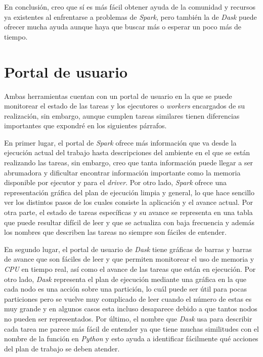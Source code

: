 En conclusión, creo que sí es más fácil obtener ayuda de la comunidad y recursos ya existentes al enfrentarse a problemas de \textit{Spark}, pero también la de \textit{Dask} puede ofrecer mucha ayuda aunque haya que buscar más o esperar un poco más de tiempo.

\section{Portal de usuario}

Ambas herramientas cuentan con un portal de usuario en la que se puede monitorear el estado de las tareas y los ejecutores o \textit{workers} encargados de su realización, sin embargo, aunque cumplen tareas similares tienen diferencias importantes que expondré en los siguientes párrafos.

En primer lugar, el portal de \textit{Spark} ofrece más información que va desde la ejecución actual del trabajo hasta descripciones del ambiente en el que se están realizando las tareas, sin embargo, creo que tanta información puede llegar a ser abrumadora y dificultar encontrar información importante como la memoria disponible por ejecutor y para el \textit{driver}. Por otro lado, \textit{Spark} ofrece una representación gráfica del plan de ejecución limpia y general, lo que hace sencillo ver los distintos pasos de los cuales consiste la aplicación y el avance actual. Por otra parte, el estado de tareas específicas y su avance se representa en una tabla que puede resultar difícil de leer y que se actualiza con baja frecuencia y además los nombres que describen las tareas no siempre son fáciles de entender.

En segundo lugar, el portal de usuario de \textit{Dask} tiene gráficas de barras y barras de avance que son fáciles de leer y que permiten monitorear el uso de memoria y \textit{CPU} en tiempo real, así como el avance de las tareas que están en ejecución. Por otro lado, \textit{Dask} representa el plan de ejecución mediante una gráfica en la que cada nodo es una acción sobre una partición, lo cuál puede ser útil para pocas particiones pero se vuelve muy complicado de leer cuando el número de estas es muy grande y en algunos casos esta incluso desaparece debido a que tantos nodos no pueden ser representados. Por último, el nombre que \textit{Dask} usa para describir cada tarea me parece más fácil de entender ya que tiene muchas similitudes con el nombre de la función en \textit{Python} y esto ayuda a identificar fácilmente qué acciones del plan de trabajo se deben atender.

